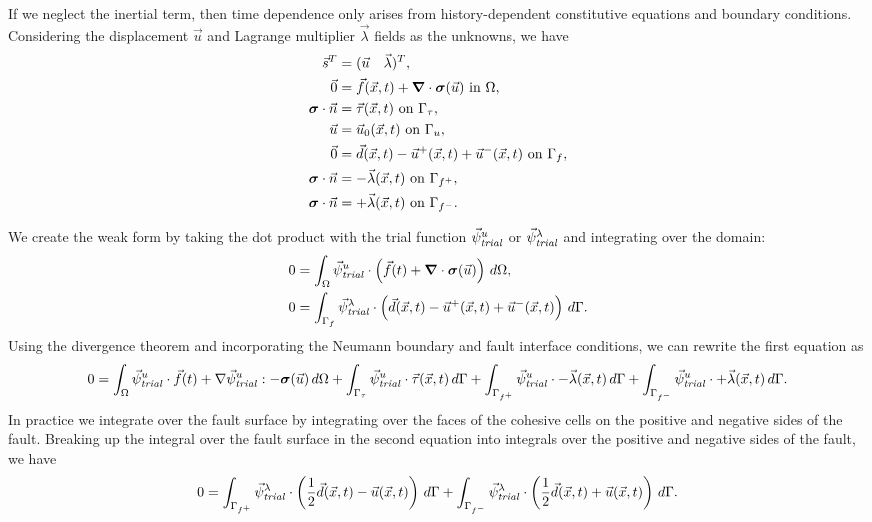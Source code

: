 If we neglect the inertial term, then time dependence only arises
from history-dependent constitutive equations and boundary conditions. Considering the
displacement $\vec{u}$ and Lagrange multiplier $\vec{\lambda}$ fields as the unknowns, we have
\begin{align}
  \vec{s}^T &= (\vec{u} \quad \vec{\lambda})^T, \\
%
  \vec{0} &= \vec{f}(\vec{x},t) + \tensor{\nabla} \cdot \tensor{\sigma}(\vec{u}) \text{ in }
\Omega, \\
  \tensor{\sigma} \cdot \vec{n} &= \vec{\tau}(\vec{x},t) \text{ on }\Gamma_\tau, \\
  \vec{u} &= \vec{u}_0(\vec{x},t) \text{ on }\Gamma_u, \\
  \vec{0} &= \vec{d}(\vec{x},t) - \vec{u}^+(\vec{x},t) + \vec{u}^-(\vec{x},t) \text{ on }\Gamma_f, \\
  \tensor{\sigma} \cdot \vec{n} &= -\vec{\lambda}(\vec{x},t) \text{ on }\Gamma_{f^+}, \\
  \tensor{\sigma} \cdot \vec{n} &= +\vec{\lambda}(\vec{x},t) \text{ on }\Gamma_{f^-}.
\end{align}

We create the weak form by taking the dot product with the trial
function $\trialvec[u]$ or $\trialvec[\lambda]$ and integrating over the domain:
\begin{align}
  0 &= \int_\Omega \trialvec[u] \cdot \left( \vec{f}(t) + \tensor{\nabla} \cdot \tensor{\sigma} (\vec{u}) \right) \, d\Omega, \\
  0 &= \int_{\Gamma_f} \trialvec[\lambda] \cdot \left( \vec{d}(\vec{x},t) - \vec{u}^+(\vec{x},t) + \vec{u}^-(\vec{x},t) \right) \, d\Gamma.
\end{align}
Using the divergence theorem and incorporating the Neumann boundary and fault interface
conditions, we can rewrite the first equation as
\begin{equation}
  0 = \int_\Omega \trialvec[u] \cdot \vec{f}(t) + \nabla \trialvec[u] : -\tensor{\sigma}
  (\vec{u}) \, d\Omega
  + \int_{\Gamma_\tau} \trialvec[u] \cdot \vec{\tau}(\vec{x},t) \, d\Gamma
  + \int_{\Gamma_{f^+}} \trialvec[u] \cdot -\vec{\lambda}(\vec{x},t) \, d\Gamma
  + \int_{\Gamma_{f^-}} \trialvec[u] \cdot +\vec{\lambda}(\vec{x},t) \, d\Gamma. \\
\end{equation}
In practice we integrate over the fault surface by integrating over
the faces of the cohesive cells on the positive and negative sides of
the fault. Breaking up the integral over the fault surface in the
second equation into integrals over the positive and negative sides of
the fault, we have
\begin{equation}
  0 = \int_{\Gamma_{f^+}} \trialvec[\lambda] \cdot \left( \frac{1}{2}\vec{d}(\vec{x},t) - \vec{u}(\vec{x},t) \right) \, d\Gamma
    + \int_{\Gamma_{f^-}} \trialvec[\lambda] \cdot \left( \frac{1}{2}\vec{d}(\vec{x},t) + \vec{u}(\vec{x},t) \right) \, d\Gamma.
  \end{equation}


